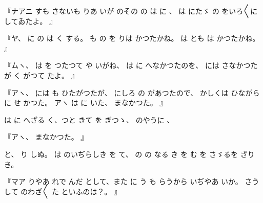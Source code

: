 『ナアニ
すも
さないも
りあ
いが
のその
の
は
に
、
は
にたゞ
の
をいろ〳〵に
してゐたよ。
』

『ヤ、
に
の
は
く
する。
も
の
を
りは
かつたかね。
は
とも
は
かつたかね。
』

『ムヽ、
は
を
つたつて
や
いがね、
は
に
へなかつたのを、
には
さなかつたが
く
がつて
たよ。
』

『アヽ、
には
も
ひたがつたが、
にしろ
の
があつたので、
かしくは
ひながら
に
せ
かつた。
アヽ
は
に
いた、
まなかつた。
』

は
に
へざる
く、つと
きて
を
ぎつゝ、
のやうに
、

『アヽ、
まなかつた。
』

と、
り
しぬ。
は
のいぢらしき
を
て、
の
の
なる
き
を
む
を
さゞるを
ざりき。

『マア
りやあ
れで
んだ
として、また
に
う
も
らうから
いぢやあ
いか。
さうして
のわざ〳〵
た
といふのは？。
』

